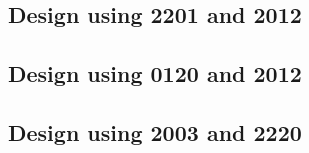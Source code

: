 \subsection{Design using 2201 and 2012}


 \begin{center}




 \end{center}



\subsection{Design using 0120 and 2012}


 \begin{center}




 \end{center}



\subsection{Design using 2003 and 2220}


 \begin{center}




 \end{center}



